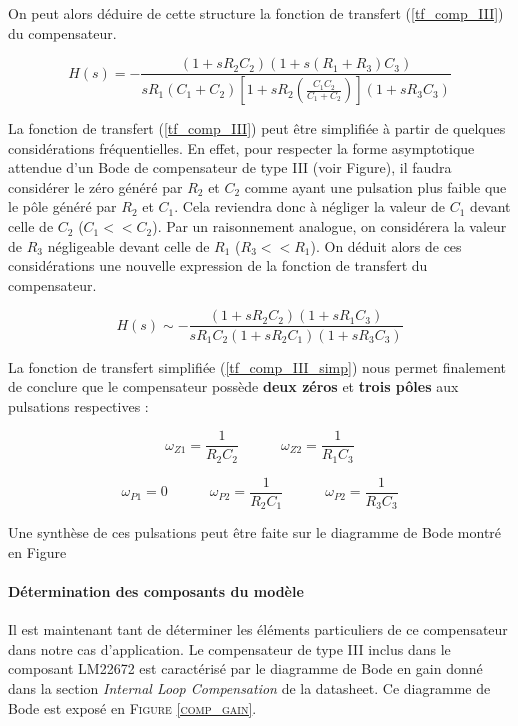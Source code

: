 					On peut alors déduire de cette structure la fonction de transfert (\ref{tf_comp_III}) du compensateur.
					
					\begin{equation}
						H(s) = -\frac{(1+s R_2 C_2)(1+s(R_1+R_3)C_3)}{sR_1(C_1+C_2)\left[1+sR_2\left(\frac{C_1C_2}{C_1+C_2}\right)\right](1+sR_3C_3)}
						\label{tf_comp_III}
					\end{equation}
					
					La fonction de transfert (\ref{tf_comp_III}) peut être simplifiée à partir de quelques considérations fréquentielles. En effet, pour respecter la forme asymptotique attendue d'un Bode de compensateur de type III (voir Figure), il faudra considérer le zéro généré par $R_2$ et $C_2$ comme ayant une pulsation plus faible que le pôle généré par $R_2$ et $C_1$. Cela reviendra donc à négliger la valeur de $C_1$ devant celle de $C_2$ ($C_1 << C_2$). Par un raisonnement analogue, on considérera la valeur de $R_3$ négligeable devant celle de $R_1$ ($R_3 << R_1$). On déduit alors de ces considérations une nouvelle expression de la fonction de transfert du compensateur.
					
					\begin{equation}
						H(s) \sim -\frac{(1+s R_2 C_2)(1+sR_1 C_3)}{sR_1 C_2 (1+sR_2 C_1) (1+sR_3C_3)}
						\label{tf_comp_III_simp}
					\end{equation}
					
					La fonction de transfert simplifiée (\ref{tf_comp_III_simp}) nous permet finalement de conclure que le compensateur possède \textbf{deux zéros} et \textbf{trois pôles} aux pulsations respectives :
					
					\begin{equation}
						\omega_{Z1} = \frac{1}{R_2C_2}
						\quad\quad\quad
						\omega_{Z2} = \frac{1}{R_1C_3}
					\end{equation}
					
					\begin{equation}
						\omega_{P1} = 0
						\quad\quad\quad
						\omega_{P2} = \frac{1}{R_2C_1}
						\quad\quad\quad
						\omega_{P2} = \frac{1}{R_3C_3}
					\end{equation}
					
					Une synthèse de ces pulsations peut être faite sur le diagramme de Bode montré en Figure 
					
					
					\paragraph{Détermination des composants du modèle}
					Il est maintenant tant de déterminer les éléments particuliers de ce compensateur dans notre cas d'application. Le compensateur de type III inclus dans le composant LM22672 est caractérisé par le diagramme de Bode en gain donné dans la section \textit{Internal Loop Compensation} de la datasheet. Ce diagramme de Bode est exposé en \textsc{Figure \ref{comp_gain}}.
					
